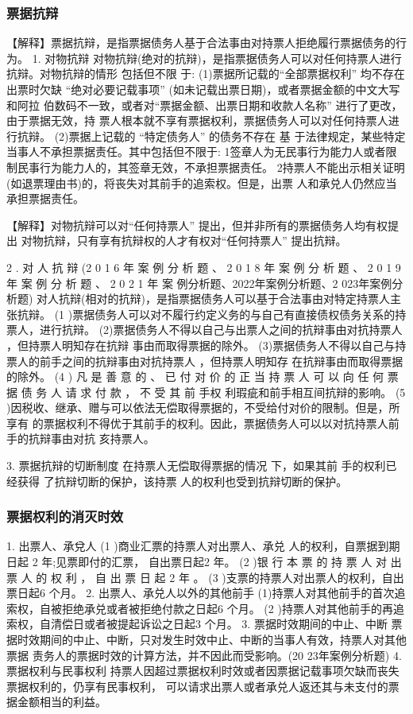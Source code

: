 \documentclass[UTF8,12pt]{ctexart}
\numberwithin{equation}{section} %
\numberwithin{figure}{section}
\numberwithin{table}{section}
\begin{document}
	\subsubsection{票据抗辩}
	
	【解释】票据抗辩，是指票据债务人基于合法事由对持票人拒绝履行票据债务的行为。
	1. 对物抗辩 对物抗辩(绝对的抗辩)，是指票据债务人可以对任何持票人进行抗辩。对物抗辩的情形 包括但不限 于:
	(1)票据所记载的“全部票据权利” 均不存在
	出票时欠缺 “绝对必要记载事项” (如未记载出票日期)，或者票据金额的中文大写和阿拉 伯数码不一致，或者对“票据金额、出票日期和收款人名称” 进行了更改，由于票据无效，持 票人根本就不享有票据权利，票据债务人可以对任何持票人进行抗辩。
	(2)票据上记载的 “特定债务人” 的债务不存在
	基 于法律规定，某些特定当事人不承担票据责任。其中包括但不限于: 1签章人为无民事行为能力人或者限制民事行为能力人的，其签章无效，不承担票据责任。 2持票人不能出示相关证明(如退票理由书)的，将丧失对其前手的追索权。但是，出票 人和承兑人仍然应当承担票据责任。
	
	
	【解释】对物抗辩可以对“任何持票人” 提出，但并非所有的票据债务人均有权提出 对物抗辩，只有享有抗辩权的人才有权对“任何持票人” 提出抗辩。
	
	2 . 对 人 抗 辩 (2 0 1 6 年 案 例 分 析 题 、 2 0 1 8 年 案 例 分 析 题 、 2 0 1 9 年 案 例 分 析 题 、 2 0 2 1 年 案
	例分析题、2022年案例分析题、2 023年案例分析题)
	对人抗辩(相对的抗辩)，是指票据债务人可以基于合法事由对特定持票人主张抗辩。
	(1 )票据债务人可以对不履行约定义务的与自己有直接债权债务关系的持票人，进行抗辩。
	(2)票据债务人不得以自己与出票人之间的抗辩事由对抗持票人 ，但持票人明知存在抗辩
	事由而取得票据的除外。
	(3)票据债务人不得以自己与持票人的前手之间的抗辩事由对抗持票人 ，但持票人明知存
	在抗辩事由而取得票据的除外。
	(4 ) 凡 是 善 意 的 、 已 付 对 价 的 正 当 持 票 人 可 以 向 任 何 票 据 债 务 人 请 求 付 款 ， 不 受 其 前 手权
	利瑕疵和前手相互间抗辩的影响。
	(5 )因税收、继承、赠与可以依法无偿取得票据的，不受给付对价的限制。但是，所享有
	的票据权利不得优于其前手的权利。因此，票据债务人可以以对抗持票人前手的抗辩事由对抗
	亥持票人。
	
	3. 票据抗辩的切断制度
	在持票人无偿取得票据的情况 下，如果其前 手的权利已经获得 了抗辩切断的保护，该持票
	人的权利也受到抗辩切断的保护。
	
	\subsubsection{票据权利的消灭时效} 
	1. 出票人、承兌人
	(1 )商业汇票的持票人对出票人、承兑 人的权利，自票据到期日起 2 年;见票即付的汇票，
	自出票日起2 年。
	(2 )银 行 本 票 的 持 票 人 对 出 票 人 的 权 利 ， 自 出 票 日 起 2 年 。
	(3 )支票的持票人对出票人的权利，自出票日起6 个月。
	2. 出票人、承兑人以外的其他前手
	(1)持票人对其他前手的首次追索权，自被拒绝承兑或者被拒绝付款之日起6 个月。
	(2 )持票人对其他前手的再追索权，自清偿日或者被提起诉讼之日起3 个月。
	3. 票据时效期间的中止、中断
	票据时效期间的中止、中断，只对发生时效中止、中断的当事人有效，持票人对其他票据
	责务人的票据时效的计算方法，并不因此而受影响。(20 23年案例分析题)
	4. 票据权利与民事权利
	持票人因超过票据权利时效或者因票据记载事项欠缺而丧失票据权利的，仍享有民事权利，
	可以请求出票人或者承兑人返还其与未支付的票据金额相当的利益。
	
\end{document}
